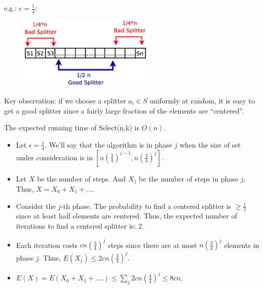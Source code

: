 \documentclass[mathserif]{beamer}
\begin{document}
{e.g.: $\epsilon=\frac{1}{4}$: 
\begin{figure}
\includegraphics[width=2.5in]{L12-randomdcsplitter.eps}
\end{figure}

Key observation: if we choose a splitter $a_i \in S$ uniformly at random, it is easy to get a good splitter since a fairly large fraction of the elements are ``centered''. 

\begin{Theorem}
 The expected running time of Select(n,k) is $O(n)$.
\end{Theorem}
\begin{Proof}
 \begin{itemize}
  \item Let $\epsilon=\tfrac{1}{4}$. We'll say that the algorithm is in phase $j$ when the size of set under consideration is in $[n(\tfrac{3}{4})^{j-1}, n(\tfrac{3}{4})^{j}]$. 
  \item Let $X$ be the number of steps. And $X_j$ be the number of steps in phase $j$. Thus, $X=X_0+X_1+...$. 
  \item Consider the $j$-th phase. The probability to find a centered splitter is $\geq \tfrac{1}{2}$ since  at least half elements are centered. Thus, the expected number of iterations  to find a centered splitter is: $2$. 
  \item Each iteration costs $cn(\tfrac{3}{4})^j$ steps since there are at most $n(\tfrac{3}{4})^j$ elements in phase $j$. Thus,  $E(X_j)\leq 2 cn(\tfrac{3}{4})^j$.
  \item $E(X) = E(X_0 + X_1 + ....) \leq \sum_j 2cn (\tfrac{3}{4})^j \leq 8cn$.  
 \end{itemize}

\end{Proof}

}

\end{document}
